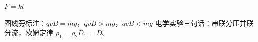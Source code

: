 $F=kt$%

图线旁标注：$qvB=mg$，$qvB>mg$，$qvB<mg$
电学实验三句话：串联分压\quad 并联分流，欧姆定律
$\rho_1=\rho_2$\quad $D_1=D_2$

